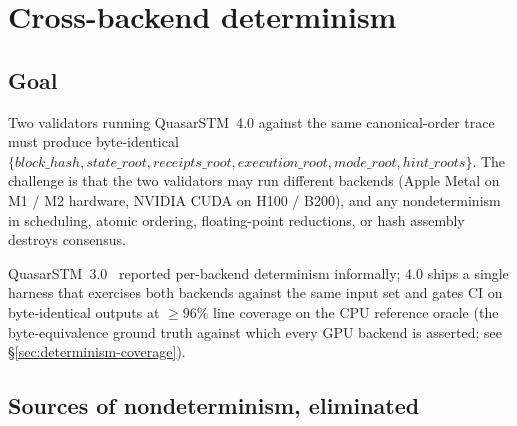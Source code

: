 \section{Cross-backend determinism}

\label{sec:determinism}

\subsection{Goal}

Two validators running QuasarSTM~4.0 against the same canonical-order
trace must produce byte-identical
$\{\mathit{block\_hash}, \mathit{state\_root}, \mathit{receipts\_root},
\mathit{execution\_root}, \mathit{mode\_root}, \mathit{hint\_roots}\}$.
The challenge is that the two validators may run different backends
(Apple Metal on M1 / M2 hardware, NVIDIA CUDA on H100 / B200), and any
nondeterminism in scheduling, atomic ordering, floating-point
reductions, or hash assembly destroys consensus.

QuasarSTM~3.0~\cite{lp010-quasarstm-3} reported per-backend determinism
informally; 4.0 ships a single harness that exercises both backends
against the same input set and gates CI on byte-identical outputs at
$\geq 96\%$ line coverage on the CPU reference oracle (the
byte-equivalence ground truth against which every GPU backend is
asserted; see \S\ref{sec:determinism-coverage}).

\subsection{Sources of nondeterminism, eliminated}

